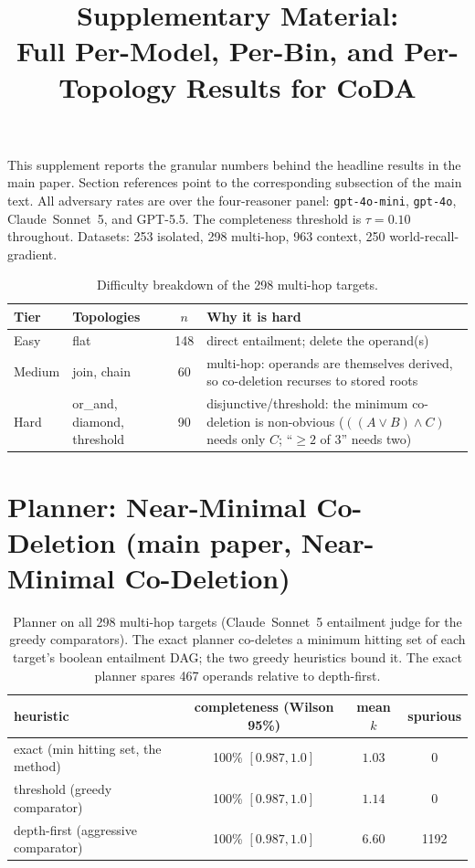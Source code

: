 \documentclass[11pt]{article}
\title{Supplementary Material:\\ Full Per-Model, Per-Bin, and Per-Topology Results for CoDA}
\author{}
\date{}
\begin{document}
\maketitle

This supplement reports the granular numbers behind the headline results in the main
paper. Section references point to the corresponding subsection of the main text.
All adversary rates are over the four-reasoner panel: \texttt{gpt-4o-mini},
\texttt{gpt-4o}, Claude~Sonnet~5, and GPT-5.5. The completeness threshold is
$\tau=0.10$ throughout. Datasets: 253 isolated, 298 multi-hop, 963 context, 250
world-recall-gradient.

\begin{table}[h]\centering\small
\begin{tabular}{@{}llcp{50mm}@{}}
\toprule Tier & Topologies & $n$ & Why it is hard \\ \midrule
Easy & flat & 148 & direct entailment; delete the operand(s) \\
Medium & join, chain & 60 & multi-hop: operands are themselves derived, so co-deletion recurses to stored roots \\
Hard & or\_and, diamond, threshold & 90 & disjunctive/threshold: the minimum co-deletion is non-obvious ($((A\vee B)\wedge C)$ needs only $C$; ``$\geq2$ of $3$'' needs two) \\ \bottomrule
\end{tabular}
\caption{Difficulty breakdown of the 298 multi-hop targets.}
\end{table}

\section{Planner: Near-Minimal Co-Deletion (main paper, Near-Minimal Co-Deletion)}

\begin{table}[h]
\centering
\begin{tabular}{@{}lccc@{}}
\toprule
heuristic & completeness (Wilson 95\%) & mean $k$ & spurious \\
\midrule
exact (min hitting set, the method) & 100\% $[0.987, 1.0]$ & $1.03$ & 0 \\
threshold (greedy comparator)       & 100\% $[0.987, 1.0]$ & $1.14$ & 0 \\
depth-first (aggressive comparator) & 100\% $[0.987, 1.0]$ & $6.60$ & 1192 \\
\bottomrule
\end{tabular}
\caption{Planner on all 298 multi-hop targets (Claude~Sonnet~5 entailment judge for the
greedy comparators). The exact planner co-deletes a minimum hitting set of each target's
boolean entailment DAG; the two greedy heuristics bound it. The exact planner spares 467
operands relative to depth-first.}
\end{table}
\end{document}
